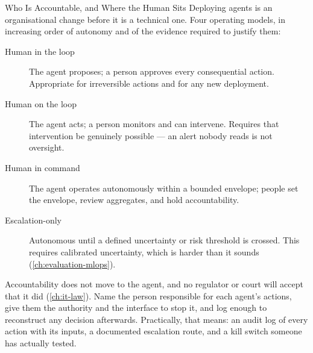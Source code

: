 \begin{v3topic}{Who Is Accountable, and Where the Human Sits}
    Deploying agents is an organisational change before it is a technical one.
    Four operating models, in increasing order of autonomy and of the evidence
    required to justify them:

    \begin{description}
      \item[Human in the loop] The agent proposes; a person approves every
        consequential action. Appropriate for irreversible actions and for any
        new deployment.
      \item[Human on the loop] The agent acts; a person monitors and can
        intervene. Requires that intervention be genuinely possible --- an
        alert nobody reads is not oversight.
      \item[Human in command] The agent operates autonomously within a
        bounded envelope; people set the envelope, review aggregates, and hold
        accountability.
      \item[Escalation-only] Autonomous until a defined uncertainty or risk
        threshold is crossed. This requires calibrated uncertainty, which is
        harder than it sounds (\cref{ch:evaluation-mlops}).
    \end{description}

\begin{engineernote}
Accountability does not move to the agent, and no regulator or court will
accept that it did (\cref{ch:it-law}). Name the person responsible for each
agent's actions, give them the authority and the interface to stop it, and log
enough to reconstruct any decision afterwards. Practically, that means: an
audit log of every action with its inputs, a documented escalation route, and
a kill switch someone has actually tested.
\end{engineernote}
\end{v3topic}

